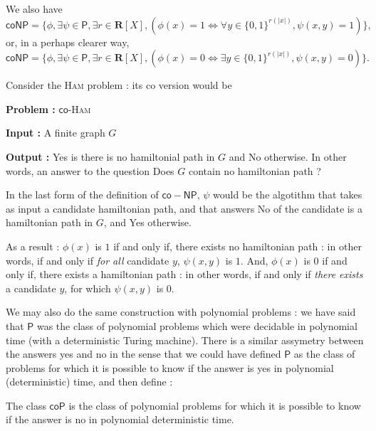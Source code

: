 \begin{proposition}
    We also have
    \[
        \mathsf{coNP} = \{ \phi, \exists \psi \in \mathsf P, \exists r \in \mathbf R[X], (\phi(x) = 1 \iff \forall y \in \{ 0,1 \}^{r(|x|)}, \psi(x,y) = 1 ) \},
    \]
    or, in a perhaps clearer way, 
    \[
        \mathsf{coNP} = \{ \phi, \exists \psi \in \mathsf P, \exists r \in \mathbf R[X], (\phi(x) = 0 \iff \exists y \in \{ 0,1 \}^{r(|x|)}, \psi(x,y) = 0 ) \}.
    \]
\end{proposition}

\begin{example}
    Consider the \textsc{Ham} problem : its \og co \fg version would be

    \begin{problem}
        \textbf{Problem :} $ \mathsf{co} $-\textsc{Ham}

        \textbf{Input :} A finite graph $ G $

        \textbf{Output :} \og Yes \fg is there is no hamiltonial path in $ G $ and \fg No \og otherwise. In other words, an answer to the question \og Does $ G $ \fg contain no hamiltonian path ?
    \end{problem}

    In the last form of the definition of $ \mathsf{co-NP} $, $ \psi $ would be the algotithm that takes as input a candidate hamiltonian path, and that answers \og No \fg of the candidate is a hamiltonian path in $ G $, and \og Yes \fg otherwise.

    As a result : $ \phi(x) $ is $ 1 $ if and only if, there exists no hamiltonian path : in other words, if and only if \textit{for all} candidate $ y $, $ \psi(x,y) $ is $ 1 $. And, $ \phi(x) $ is $ 0 $ if and only if, there exists a hamiltonian path : in other words, if and only if \textit{there exists} a candidate $ y $, for which $ \psi(x,y) $ is $ 0 $.
\end{example}

We may also do the same construction with polynomial problems : we have said that $ \mathsf P $ was the class of polynomial problems which were decidable in polynomial time (with a deterministic Turing machine). There is a \og similar \fg assymetry between the answers \og yes \fg and \og no \fg in the sense that we could have defined $ \mathsf P $ as the class of problems for which it is possible to know if the answer is \og yes \fg in polynomial (deterministic) time, and then define :

\begin{definition}
    The class $ \mathsf{coP} $ is the class of polynomial problems for which it is possible to know if the answer is \og no \fg in polynomial deterministic time.
\end{definition}

